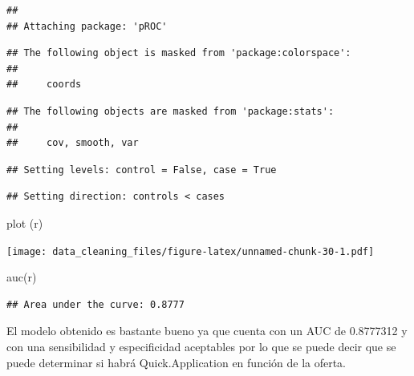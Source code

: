 \documentclass[
]{article}
\newenvironment{Shaded}{\begin{snugshade}}{\end{snugshade}}
\newcommand{\DataTypeTok}[1]{\textcolor[rgb]{0.87,0.87,0.75}{#1}}
\newcommand{\KeywordTok}[1]{\textcolor[rgb]{0.94,0.87,0.69}{#1}}
\newcommand{\NormalTok}[1]{\textcolor[rgb]{0.80,0.80,0.80}{#1}}
\newcommand{\OperatorTok}[1]{\textcolor[rgb]{0.94,0.94,0.82}{#1}}
\newcommand{\StringTok}[1]{\textcolor[rgb]{0.80,0.58,0.58}{#1}}
\begin{document}
\begin{verbatim}
## 
## Attaching package: 'pROC'
\end{verbatim}

\begin{verbatim}
## The following object is masked from 'package:colorspace':
## 
##     coords
\end{verbatim}

\begin{verbatim}
## The following objects are masked from 'package:stats':
## 
##     cov, smooth, var
\end{verbatim}

\begin{Shaded}
\end{Shaded}

\begin{verbatim}
## Setting levels: control = False, case = True
\end{verbatim}

\begin{verbatim}
## Setting direction: controls < cases
\end{verbatim}

\begin{Shaded}
\begin{Highlighting}[]
\KeywordTok{plot}\NormalTok{ (r)}
\end{Highlighting}
\end{Shaded}

\texttt{[image: data\_cleaning\_files/figure-latex/unnamed-chunk-30-1.pdf]}

\begin{Shaded}
\begin{Highlighting}[]
\KeywordTok{auc}\NormalTok{(r)}
\end{Highlighting}
\end{Shaded}

\begin{verbatim}
## Area under the curve: 0.8777
\end{verbatim}

El modelo obtenido es bastante bueno ya que cuenta con un AUC de
0.8777312 y con una sensibilidad y especificidad aceptables por lo que
se puede decir que se puede determinar si habrá Quick.Application en
función de la oferta.
\end{document}
